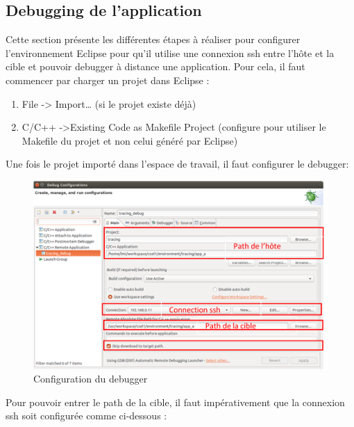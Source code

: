 \subsection{Debugging de l'application}
Cette section présente les différentes étapes à réaliser pour configurer l'environnement Eclipse pour qu’il utilise une connexion ssh entre l’hôte et la cible et pouvoir debugger à distance une application.
Pour cela, il faut commencer par charger un projet dans Eclipse :
\begin{enumerate}
	\item File -> Import… (si le projet existe déjà)
	\item C/C++ ->Existing Code as Makefile Project (configure pour utiliser le Makefile du projet et non celui généré par Eclipse)
\end{enumerate}
Une fois le projet importé dans l’espace de travail, il faut configurer le debugger:
\begin{figure}[H]
	\begin{center}
		\includegraphics[width=16cm]{img/eclipseConfig1.png}
		\caption{Configuration du debugger}
		\label{eclipseConfig1}
	\end{center}
\end{figure}
Pour pouvoir entrer le path de la cible, il faut impérativement que la connexion ssh soit configurée comme ci-dessous :
